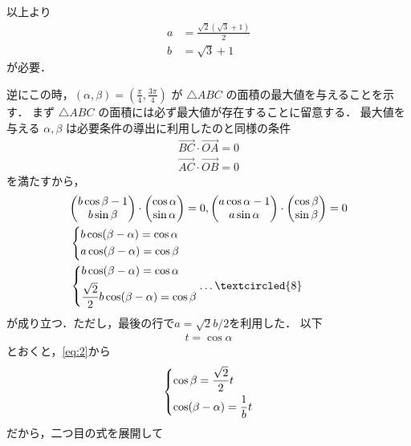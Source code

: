 \documentclass[a4paper,10pt]{ltjsarticle}
\begin{document}
\begin{multicols}{2}
  以上より
  \begin{align*}
    a & =  \frac{\sqrt{2}(\sqrt{3}+1)}{2} \\
    b & = \sqrt{3}+1
  \end{align*}
  が必要．

  逆にこの時，$(\alpha,\beta)=(\frac{\pi}{4},\frac{3\pi}{4})$ が $\triangle ABC$ の面積の最大値を与えることを示す．
  まず $\triangle ABC$ の面積には必ず最大値が存在することに留意する．
  最大値を与える $\alpha,\beta$ は必要条件の導出に利用したのと同様の条件
  \begin{align*}
    \vec{BC}\cdot\vec{OA}=0 \\
    \vec{AC}\cdot\vec{OB}=0
  \end{align*}
  を満たすから，
  \begin{align}
     & \mqty(b\cos\beta-1                                             \\ b\sin\beta) \cdot \mqty(\cos\alpha \\ \sin\alpha) = 0,
    \mqty(a\cos\alpha-1                                               \\ a\sin\alpha) \cdot \mqty( \cos\beta \\ \sin\beta ) = 0 \\
     & \begin{dcases}
         b\cos(\beta-\alpha) = \cos\alpha \\
         a\cos(\beta-\alpha) = \cos\beta
       \end{dcases}                               \\
     & \begin{dcases}
         b\cos(\beta-\alpha) = \cos\alpha \\
         \frac{\sqrt{2}}{2}b\cos(\beta-\alpha) = \cos\beta
       \end{dcases} \label{eq:2}
    \dots\textcircled{8}
  \end{align}
  が成り立つ．ただし，最後の行で$a=\sqrt{2}b/2$を利用した．
  以下
  \begin{align*}
    t = \cos\alpha
  \end{align*}
  とおくと，\cref{eq:2}から
  \begin{align}
    \begin{dcases}
      \cos\beta = \frac{\sqrt{2}}{2} t \\
      \cos(\beta-\alpha) = \frac{1}{b} t
    \end{dcases} \label{eq:5}
  \end{align}
  だから，二つ目の式を展開して
  \begin{align}

\end{align}
\end{multicols}
\end{document}

